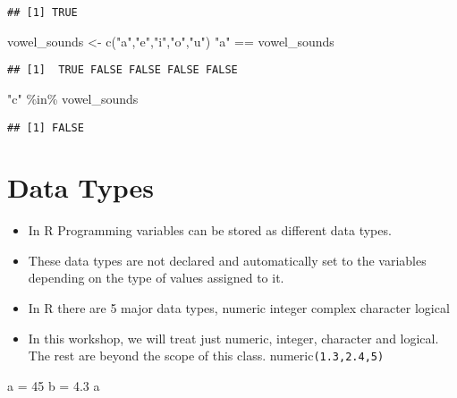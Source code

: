 \documentclass[
]{article}
\newenvironment{Shaded}{\begin{snugshade}}{\end{snugshade}}
\newcommand{\DecValTok}[1]{\textcolor[rgb]{0.00,0.00,0.81}{#1}}
\newcommand{\FloatTok}[1]{\textcolor[rgb]{0.00,0.00,0.81}{#1}}
\newcommand{\FunctionTok}[1]{\textcolor[rgb]{0.00,0.00,0.00}{#1}}
\newcommand{\NormalTok}[1]{#1}
\newcommand{\OtherTok}[1]{\textcolor[rgb]{0.56,0.35,0.01}{#1}}
\newcommand{\SpecialCharTok}[1]{\textcolor[rgb]{0.00,0.00,0.00}{#1}}
\newcommand{\StringTok}[1]{\textcolor[rgb]{0.31,0.60,0.02}{#1}}
\providecommand{\tightlist}{%
  \setlength{\itemsep}{0pt}\setlength{\parskip}{0pt}}
\begin{document}
\begin{verbatim}
## [1] TRUE
\end{verbatim}

\begin{Shaded}
\begin{Highlighting}[]
\NormalTok{vowel\_sounds }\OtherTok{\textless{}{-}} \FunctionTok{c}\NormalTok{(}\StringTok{"a"}\NormalTok{,}\StringTok{"e"}\NormalTok{,}\StringTok{"i"}\NormalTok{,}\StringTok{"o"}\NormalTok{,}\StringTok{"u"}\NormalTok{)}
\StringTok{"a"} \SpecialCharTok{==}\NormalTok{ vowel\_sounds}
\end{Highlighting}
\end{Shaded}

\begin{verbatim}
## [1]  TRUE FALSE FALSE FALSE FALSE
\end{verbatim}

\begin{Shaded}
\begin{Highlighting}[]
\StringTok{"c"} \SpecialCharTok{\%in\%}\NormalTok{ vowel\_sounds}
\end{Highlighting}
\end{Shaded}

\begin{verbatim}
## [1] FALSE
\end{verbatim}

\hypertarget{data-types}{%
\section{Data Types}\label{data-types}}

\begin{itemize}
\tightlist
\item
  In R Programming variables can be stored as different data types.\\
\item
  These data types are not declared and automatically set to the
  variables depending on the type of values assigned to it.\\
\item
  In R there are 5 major data types, numeric integer complex character
  logical
\item
  In this workshop, we will treat just numeric, integer, character and
  logical. The rest are beyond the scope of this class.
  numeric\texttt{(1.3,2.4,5)}
\end{itemize}

\begin{Shaded}
\begin{Highlighting}[]
\NormalTok{a }\OtherTok{=} \DecValTok{45}
\NormalTok{b }\OtherTok{=} \FloatTok{4.3}
\NormalTok{a}
\end{Highlighting}
\end{Shaded}
\end{document}
